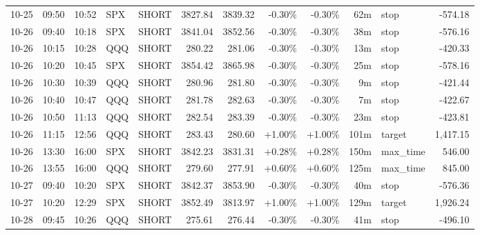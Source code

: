 \documentclass[11pt,a4paper,twoside]{article}
\begin{document}
\begin{center}
\begin{longtable}{>{\color{txtmain}}l l l l l r r r r r >{\color{txtmain}}l r}
10-25 & 09:50 & 10:52 & SPX & SHORT & 3827.84 & 3839.32 & \textcolor{lossred}{-0.30\%} & \textcolor{lossred}{-0.30\%} & 62m & stop & \textcolor{lossred}{-574.18} \\
10-26 & 09:40 & 10:18 & SPX & SHORT & 3841.04 & 3852.56 & \textcolor{lossred}{-0.30\%} & \textcolor{lossred}{-0.30\%} & 38m & stop & \textcolor{lossred}{-576.16} \\
10-26 & 10:15 & 10:28 & QQQ & SHORT & 280.22 & 281.06 & \textcolor{lossred}{-0.30\%} & \textcolor{lossred}{-0.30\%} & 13m & stop & \textcolor{lossred}{-420.33} \\
10-26 & 10:20 & 10:45 & SPX & SHORT & 3854.42 & 3865.98 & \textcolor{lossred}{-0.30\%} & \textcolor{lossred}{-0.30\%} & 25m & stop & \textcolor{lossred}{-578.16} \\
10-26 & 10:30 & 10:39 & QQQ & SHORT & 280.96 & 281.80 & \textcolor{lossred}{-0.30\%} & \textcolor{lossred}{-0.30\%} & 9m & stop & \textcolor{lossred}{-421.44} \\
10-26 & 10:40 & 10:47 & QQQ & SHORT & 281.78 & 282.63 & \textcolor{lossred}{-0.30\%} & \textcolor{lossred}{-0.30\%} & 7m & stop & \textcolor{lossred}{-422.67} \\
10-26 & 10:50 & 11:13 & QQQ & SHORT & 282.54 & 283.39 & \textcolor{lossred}{-0.30\%} & \textcolor{lossred}{-0.30\%} & 23m & stop & \textcolor{lossred}{-423.81} \\
10-26 & 11:15 & 12:56 & QQQ & SHORT & 283.43 & 280.60 & \textcolor{wingreen}{+1.00\%} & \textcolor{wingreen}{+1.00\%} & 101m & target & \textcolor{wingreen}{1,417.15} \\
10-26 & 13:30 & 16:00 & SPX & SHORT & 3842.23 & 3831.31 & \textcolor{wingreen}{+0.28\%} & \textcolor{wingreen}{+0.28\%} & 150m & max\_time & \textcolor{wingreen}{546.00} \\
10-26 & 13:55 & 16:00 & QQQ & SHORT & 279.60 & 277.91 & \textcolor{wingreen}{+0.60\%} & \textcolor{wingreen}{+0.60\%} & 125m & max\_time & \textcolor{wingreen}{845.00} \\
10-27 & 09:40 & 10:20 & SPX & SHORT & 3842.37 & 3853.90 & \textcolor{lossred}{-0.30\%} & \textcolor{lossred}{-0.30\%} & 40m & stop & \textcolor{lossred}{-576.36} \\
10-27 & 10:20 & 12:29 & SPX & SHORT & 3852.49 & 3813.97 & \textcolor{wingreen}{+1.00\%} & \textcolor{wingreen}{+1.00\%} & 129m & target & \textcolor{wingreen}{1,926.24} \\
10-28 & 09:45 & 10:26 & QQQ & SHORT & 275.61 & 276.44 & \textcolor{lossred}{-0.30\%} & \textcolor{lossred}{-0.30\%} & 41m & stop & \textcolor{lossred}{-496.10} \\

\end{longtable}
\end{center}
\end{document}
